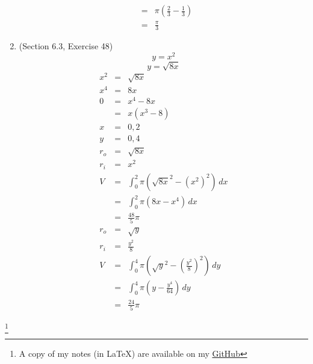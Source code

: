\documentclass{article}
\newcommand\blfootnote[1]{
    \begingroup
    \renewcommand\thefootnote{}\footnote{#1}
    \addtocounter{footnote}{-1}
    \endgroup
}
\begin{document}
\begin{enumerate}
\begin{eqnarray}
              &=& \pi\left(\frac{2}{3} - \frac{1}{3}\right) \\
              &=& \frac{\pi}{3}
        \end{eqnarray}
    \item (Section 6.3, Exercise 48)
        $$y = x^2$$
        $$y = \sqrt{8x}$$
        \begin{eqnarray}
            x^2 &=& \sqrt{8x} \\
            x^4 &=& 8x \\
            0 &=& x^4 - 8x \\
              &=& x\left(x^3 - 8\right) \\
            x &=& 0, 2 \\
            y &=& 0, 4 \\
            r_o &=& \sqrt{8x} \\
            r_i &=& x^2 \\
            V &=& \int_0^2{\pi\left(\sqrt{8x}^2 - \left(x^2\right)^2\right)\,dx} \\
              &=& \int_0^2{\pi\left(8x - x^4\right)\,dx} \\
              &=& \frac{48}{5}\pi \\
            r_o &=& \sqrt{y} \\
            r_i &=& \frac{y^2}{8} \\
            V &=& \int_0^4{\pi\left(\sqrt{y}^2 - \left(\frac{y^2}{8}\right)^2\right)\,dy} \\
              &=& \int_0^4{\pi\left(y - \frac{y^4}{64}\right)\,dy} \\
              &=& \frac{24}{5}\pi
        \end{eqnarray}
\end{enumerate}

\blfootnote{A copy of my notes (in \LaTeX) are available on my \href{https://github.com/onlinechronically/MATH-211}{GitHub}}
\end{document}
